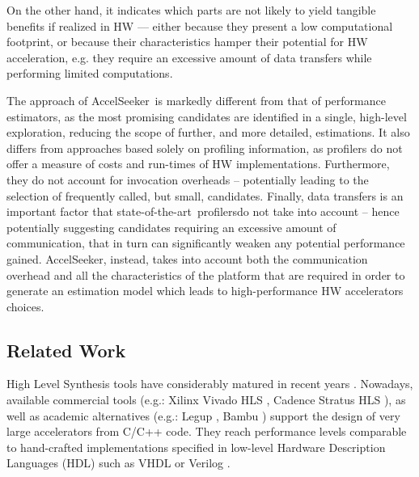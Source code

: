 \documentclass[]{usiinfthesis}
\newcommand{\aseeker}{{AccelSeeker}}
\newcommand{\SoTA}{{state-of-the-art}}
\begin{document}
On the other hand, it indicates which parts are not likely to yield tangible benefits if realized in HW --- either 
because they present a low computational footprint, or because their characteristics hamper their potential for HW 
acceleration, e.g. they require an excessive amount of data transfers while performing limited computations.\par

The approach of \aseeker\ is markedly different from that of performance estimators, as the most promising 
candidates are identified in a single, high-level exploration, reducing the scope of further, and more detailed, 
estimations. It also differs from approaches based solely on profiling information, as profilers do not offer a 
measure of costs and run-times of HW implementations. Furthermore, they do not account for invocation overheads -- 
potentially leading to the selection of frequently called, but small, candidates. Finally, data transfers is an 
important factor that \SoTA\ profilersdo not take into account -- hence potentially suggesting candidates 
requiring an excessive amount of communication, that in turn can significantly weaken any potential performance 
gained. \aseeker, instead, takes into account both the communication overhead and all the characteristics of the 
platform that are required in order to generate an estimation model which leads
to high-performance HW accelerators choices.

\subsection{Related Work}

High Level Synthesis tools have considerably matured in recent years \cite{MeeusSep12}. Nowadays, available 
commercial tools (e.g.: Xilinx Vivado HLS \cite{VivadoHLSMar17}, Cadence Stratus HLS \cite{StratusHLSApr16}), 
as well as academic alternatives (e.g.: Legup \cite{CanisSep13}, Bambu \cite{PilatoMar12}) support the design 
of very large accelerators from C/C++ code. They reach performance levels comparable to hand-crafted 
implementations specified in low-level Hardware Description Languages (HDL) such as VHDL or Verilog 
\cite{LiuFeb16}.\par
\end{document}
